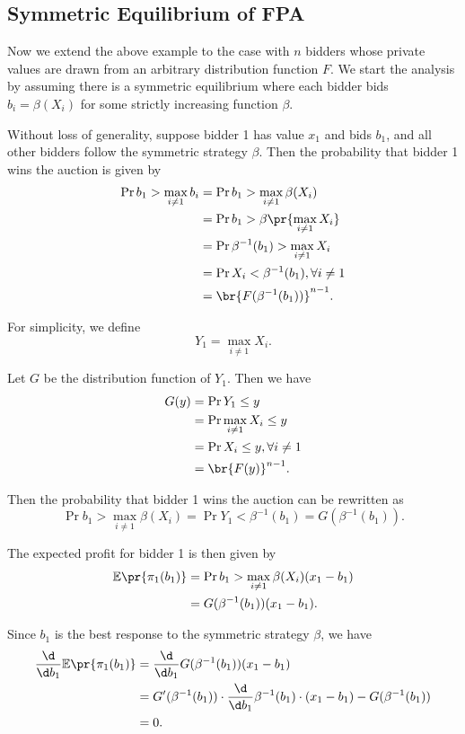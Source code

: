 \subsection{Symmetric Equilibrium of FPA}

Now we extend the above example to the case with $n$ bidders whose private values are drawn from an arbitrary distribution function $F$. We start the analysis by assuming there is a symmetric equilibrium where each bidder bids $b_i = \beta(X_i)$ for some strictly increasing function $\beta$. 

Without loss of generality, suppose bidder 1 has value $x_1$ and bids $b_1$, and all other bidders follow the symmetric strategy $\beta$. Then the probability that bidder 1 wins the auction is given by
\[
\begin{aligned}
\Pr{b_1 > \max_{i\neq 1} b_i} & = \Pr{b_1 > \max_{i\neq 1} \beta(X_i)}\\
& = \Pr{b_1>\beta\pr{\max_{i\neq 1} X_i}}\\
& = \Pr{\beta^{-1}(b_1) > \max_{i\neq 1} X_i}\\
& = \Pr{X_i < \beta^{-1}(b_1), \forall i\neq 1}\\
& = \br{F(\beta^{-1}(b_1))}^{n-1}.
\end{aligned}
\]

For simplicity, we define 
\[
Y_1 = \max_{i\neq 1} X_i.
\]

Let $G$ be the distribution function of $Y_1$. Then we have
\[
\begin{aligned}
G(y) & = \Pr{Y_1 \le y} \\
& = \Pr{\max_{i\neq 1} X_i \le y} \\
& = \Pr{X_i \le y, \forall i\neq 1} \\
& = \br{F(y)}^{n-1}.
\end{aligned}
\]

Then the probability that bidder 1 wins the auction can be rewritten as
\[
\Pr{b_1 > \max_{i\neq 1} \beta(X_i)} = \Pr{Y_1<\beta^{-1}(b_1)} = G(\beta^{-1}(b_1)).
\]

The expected profit for bidder 1 is then given by
\[
\begin{aligned}
\mathbb E\pr{\pi_1(b_1)} & = \Pr{b_1 > \max_{i\neq 1} \beta(X_i)}(x_1 - b_1)\\
& = G(\beta^{-1}(b_1))(x_1 - b_1).
\end{aligned}
\]

Since $b_1$ is the best response to the symmetric strategy $\beta$, we have
\[
\begin{aligned}
\frac{\d}{\d b_1}\mathbb E\pr{\pi_1(b_1)} & = \frac{\d}{\d b_1} G(\beta^{-1}(b_1))(x_1 - b_1)\\
& = G'(\beta^{-1}(b_1))\cdot \frac{\d}{\d b_1}\beta^{-1}(b_1)\cdot (x_1 - b_1) - G(\beta^{-1}(b_1))\\
& = 0.
\end{aligned}
\]

